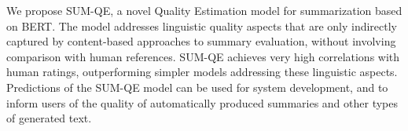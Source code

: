 We propose SUM-QE, a novel Quality Estimation model for summarization based on BERT.  The model addresses linguistic quality aspects that are only indirectly captured by content-based approaches to summary evaluation, without involving comparison with human references. SUM-QE achieves very high correlations with human ratings, outperforming  simpler models addressing these linguistic aspects. Predictions of the SUM-QE model can be used for system development, and to inform users of the quality of automatically produced summaries and other types of generated text.